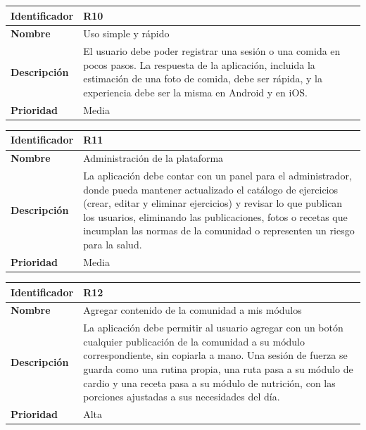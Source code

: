 \begin{table}[h!]
    \centering
    \renewcommand{\arraystretch}{1.3}
    \begin{tabular}{|p{3.5cm}|p{11.5cm}|}
        \hline
        \rowcolor[HTML]{EFEFEF} 
        \textbf{Identificador} & \textbf{R10} \\ \hline
        \textbf{Nombre} & Uso simple y rápido \\ \hline
        \textbf{Descripción} & El usuario debe poder registrar una sesión o una comida en pocos pasos. La respuesta de la aplicación, incluida la estimación de una foto de comida, debe ser rápida, y la experiencia debe ser la misma en Android y en iOS. \\ \hline
        \textbf{Prioridad} & Media \\ \hline
    \end{tabular}
\end{table}
\begin{table}[h!]
    \centering
    \renewcommand{\arraystretch}{1.3}
    \begin{tabular}{|p{3.5cm}|p{11.5cm}|}
        \hline
        \rowcolor[HTML]{EFEFEF} 
        \textbf{Identificador} & \textbf{R11} \\ \hline
        \textbf{Nombre} & Administración de la plataforma \\ \hline
        \textbf{Descripción} & La aplicación debe contar con un panel para el administrador, donde pueda mantener actualizado el catálogo de ejercicios (crear, editar y eliminar ejercicios) y revisar lo que publican los usuarios, eliminando las publicaciones, fotos o recetas que incumplan las normas de la comunidad o representen un riesgo para la salud. \\ \hline
        \textbf{Prioridad} & Media \\ \hline
    \end{tabular}
\end{table}
\newpage
\begin{table}[h!]
    \centering
    \renewcommand{\arraystretch}{1.3}
    \begin{tabular}{|p{3.5cm}|p{11.5cm}|}
        \hline
        \rowcolor[HTML]{EFEFEF} 
        \textbf{Identificador} & \textbf{R12} \\ \hline
        \textbf{Nombre} & Agregar contenido de la comunidad a mis módulos \\ \hline
        \textbf{Descripción} & La aplicación debe permitir al usuario agregar con un botón cualquier publicación de la comunidad a su módulo correspondiente, sin copiarla a mano. Una sesión de fuerza se guarda como una rutina propia, una ruta pasa a su módulo de cardio y una receta pasa a su módulo de nutrición, con las porciones ajustadas a sus necesidades del día. \\ \hline
        \textbf{Prioridad} & Alta \\ \hline
    \end{tabular}
\end{table}

